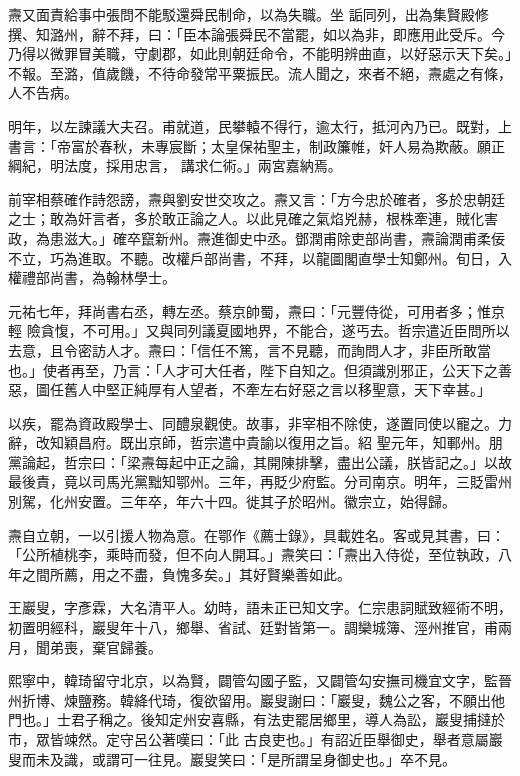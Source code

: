 \begin{pinyinscope}
 燾又面責給事中張問不能駁還舜民制命，以為失職。坐
 詬同列，出為集賢殿修撰、知潞州，辭不拜，曰：「臣本論張舜民不當罷，如以為非，即應用此受斥。今乃得以微罪冒美職，守劇郡，如此則朝廷命令，不能明辨曲直，以好惡示天下矣。」不報。至潞，值歲饑，不待命發常平粟振民。流人聞之，來者不絕，燾處之有條，人不告病。



 明年，以左諫議大夫召。甫就道，民攀轅不得行，逾太行，抵河內乃已。既對，上書言：「帝富於春秋，未專宸斷；太皇保祐聖主，制政簾帷，奸人易為欺蔽。願正綱紀，明法度，採用忠言，
 講求仁術。」兩宮嘉納焉。



 前宰相蔡確作詩怨謗，燾與劉安世交攻之。燾又言：「方今忠於確者，多於忠朝廷之士；敢為奸言者，多於敢正論之人。以此見確之氣焰兇赫，根株牽連，賊化害政，為患滋大。」確卒竄新州。燾進御史中丞。鄧潤甫除吏部尚書，燾論潤甫柔佞不立，巧為進取。不聽。改權戶部尚書，不拜，以龍圖閣直學士知鄭州。旬日，入權禮部尚書，為翰林學士。



 元祐七年，拜尚書右丞，轉左丞。蔡京帥蜀，燾曰：「元豐侍從，可用者多；惟京輕
 險貪愎，不可用。」又與同列議夏國地界，不能合，遂丐去。哲宗遣近臣問所以去意，且令密訪人才。燾曰：「信任不篤，言不見聽，而詢問人才，非臣所敢當也。」使者再至，乃言：「人才可大任者，陛下自知之。但須識別邪正，公天下之善惡，圖任舊人中堅正純厚有人望者，不牽左右好惡之言以移聖意，天下幸甚。」



 以疾，罷為資政殿學士、同醴泉觀使。故事，非宰相不除使，遂置同使以寵之。力辭，改知穎昌府。既出京師，哲宗遣中貴諭以復用之旨。紹
 聖元年，知鄆州。朋黨論起，哲宗曰：「梁燾每起中正之論，其開陳排擊，盡出公議，朕皆記之。」以故最後責，竟以司馬光黨黜知鄂州。三年，再貶少府監。分司南京。明年，三貶雷州別駕，化州安置。三年卒，年六十四。徙其子於昭州。徽宗立，始得歸。



 燾自立朝，一以引援人物為意。在鄂作《薦士錄》，具載姓名。客或見其書，曰：「公所植桃李，乘時而發，但不向人開耳。」燾笑曰：「燾出入侍從，至位執政，八年之間所薦，用之不盡，負愧多矣。」其好賢樂善如此。



 王巖叟，字彥霖，大名清平人。幼時，語未正已知文字。仁宗患詞賦致經術不明，初置明經科，巖叟年十八，鄉舉、省試、廷對皆第一。調欒城簿、涇州推官，甫兩月，聞弟喪，棄官歸養。



 熙寧中，韓琦留守北京，以為賢，闢管勾國子監，又闢管勾安撫司機宜文字，監晉州折博、煉鹽務。韓絳代琦，復欲留用。巖叟謝曰：「巖叟，魏公之客，不願出他門也。」士君子稱之。後知定州安喜縣，有法吏罷居鄉里，導人為訟，巖叟捕撻於市，眾皆竦然。定守呂公著嘆曰：「此
 古良吏也。」有詔近臣舉御史，舉者意屬巖叟而未及識，或謂可一往見。巖叟笑曰：「是所謂呈身御史也。」卒不見。




\end{pinyinscope}
